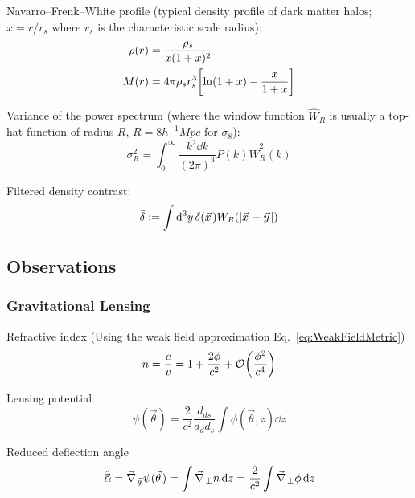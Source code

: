 		\noindent
		Navarro--Frenk--White profile (typical density profile of dark matter halos; $x=r/r_s$ where $r_s$ is the characteristic scale radius):
		\begin{align}
			\rho(r) &= \frac{\rho_s}{x(1+x)^2} \\
			M(r) &= 4\pi \rho_s r_s^3 \qty[\ln(1+x) - \frac{x}{1+x}]
		\end{align}

		\noindent
		Variance of the power spectrum (where the window function $\hat{W}_R$ is usually a top-hat function of radius $R$, \eg $R=8h^{-1}\unit{Mpc}$ for $\sigma_8$):
		\begin{equation}
			\sigma_R^2 = \int_{0}^{\infty} \frac{k^2 \dd k}{(2\pi)^3} P(k) \hat{W}^2_R(k)
		\end{equation}

		\noindent
		Filtered density contrast:
		\begin{equation}
			\bar{\delta} := \int \dd[3]{y} \delta(\vec{x}) W_R(\abs{\vec{x}-\vec{y}})
		\end{equation}

	\subsection{Observations}
		\subsubsection{Gravitational Lensing}
			Refractive index (Using the weak field approximation Eq.~\ref{eq:WeakFieldMetric})
			\begin{equation}
				n = \frac{c}{v} = 1 + \frac{2 \phi}{c^2} + \mathcal{O}\qty(\frac{\phi^2}{c^4})
			\end{equation}

			\noindent
			Lensing potential
			\begin{equation}
				\psi (\vec{\theta})  = \frac{2}{c^2} \frac{d_{ds}}{d_d d_s} \int \phi(\vec{\theta}, z) \dd{z}
			\end{equation}

			\noindent
			Reduced deflection angle
			\begin{equation}
				\hat{\vec{\alpha}}
				= \Nabla_{\vec{\theta}} \psi(\vec{\theta})
				= \int \Nabla_\perp n \dd{z}
				= \frac{2}{c^2} \int \Nabla_\perp \phi \dd{z}
			\end{equation}

